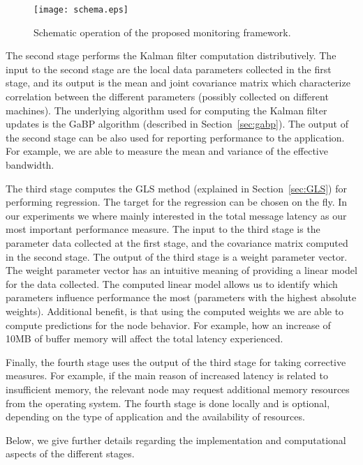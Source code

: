 \documentclass[times, 10pt,twocolumn]{article}
\begin{document}
\begin{figure}[ht!]
\begin{center}
\texttt{[image: schema.eps]}\\
  \caption{Schematic operation of the proposed monitoring framework.}\label{fig:schema}
\end{center}
\end{figure}

The second stage performs the Kalman filter computation
distributively. The input to the second stage are the
local data parameters collected in the first stage,
and its output is the mean and joint covariance matrix
which characterize correlation between the different parameters (possibly collected on different machines). The underlying algorithm
used for computing the Kalman filter updates is the GaBP algorithm (described in Section~\ref{sec:gabp}).
The output of the second stage can be also used for reporting performance to the application. For example, we
are able to measure the mean and variance of the effective bandwidth.

The third stage computes the GLS method (explained in Section~\ref{sec:GLS}) for performing regression. The target for the regression can be chosen on the fly. In our experiments we where mainly interested in the total message latency as our most important performance measure. The input to the third stage is the parameter data collected at the first stage, and the covariance matrix computed in the second stage. The output of the third stage is a weight parameter vector.
The weight parameter vector has an intuitive meaning of providing a linear model for the data collected. The computed linear model allows us to identify which parameters influence performance the most (parameters with the highest absolute weights). Additional benefit, is that using the computed weights we are able to compute predictions for the node
behavior. For example, how an increase of 10MB of buffer memory will affect the total latency experienced.

Finally, the fourth stage uses the output of the third stage for taking corrective measures. For example, if the
main reason of increased latency is related to insufficient memory, the relevant node may request additional memory resources from the operating system. The fourth stage is done locally and is optional, depending on the type of application and the availability of resources.

Below, we give further details regarding the implementation and computational aspects of the different stages.
\end{document}
